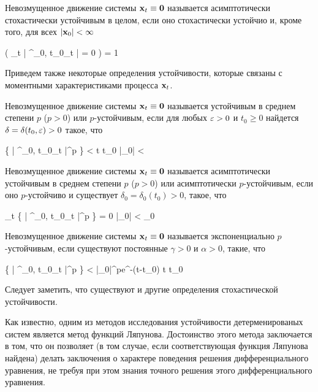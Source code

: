 \begin{df}
	Невозмущенное движение системы $\mathbf{x}_t \equiv \mathbf{0}$ называется асимптотически стохастически устойчивым в целом, если оно стохастически устойчио и, кроме того, для всех $|\mathbf{x}_0| < \infty$
	
	\beqn
		\prob \biggl( \lim\limits_{t \to \infty} \bigl| \m{x}^{_0, t_0}_t \bigr| = 0 \biggr) = 1 
	\eeqn
\end{df}

Приведем также некоторые определения устойчивости, которые связаны с моментными характеристиками процесса $\mathbf{x}_t$.

\begin{df}
	Невозмущенное движение системы $\mathbf{x}_t \equiv \mathbf{0}$ называется устойчивым в среднем степени $p$ ($p > 0$) или $p$-устойчивым, если для любых $\varepsilon > 0$ и $t_0 \geqslant 0$ найдется $\delta = \delta(t_0, \varepsilon) > 0$ такое, что
	
	\beqn
		\E \Bigl\{ \bigl| \m{x}^{_0, t_0}_t \bigr|^p \Bigr\} < \eps {} t \geqslant t_0  |_0| < \delta {}
	\eeqn
\end{df}

\begin{df}
	Невозмущенное движение системы $\mathbf{x}_t \equiv \mathbf{0}$ называется асимптотически устойчивым в среднем степени $p$ ($p > 0$) или асимптотически $p$-устойчивым, если оно $p$-устойчиво и существует $\delta_0 = \delta_0(t_0) > 0$, такое, что
	
	\beqn
		\lim\limits_{t \to \infty} \E \Bigl\{ \bigl| \m{x}^{_0, t_0}_t \bigr|^p \Bigr\} = 0  |_0| < \delta_0 
	\eeqn
\end{df}

\begin{df}
	Невозмущенное движение системы $\mathbf{x}_t \equiv \mathbf{0}$ называется экспоненциально $p$-устойчивым, если существуют постоянные $\gamma > 0$ и $\alpha > 0$, такие, что
	
	\beqn
		\E \Bigl\{ \bigl| \m{x}^{_0, t_0}_t \bigr|^p \Bigr\} < \gamma|_0|^pe^{-\alpha(t-t_0)}  t \geqslant t_0 
	\eeqn
\end{df}

Следует заметить, что существуют и другие определения стохастической устойчивости\cite{KUSHNER}.

\br

Как известно, одним из методов исследования устойчивости детерменированых систем является метод функций Ляпунова. Достоинство этого метода заключается в том, что он позволяет (в том случае, если соответствующая функция Ляпунова найдена) делать заключения о характере поведения решения дифференциального уравнения, не требуя при этом знания точного решения этого дифференциального уравнения.


